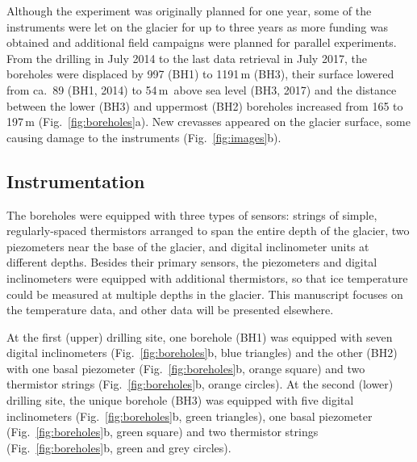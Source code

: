 \documentclass[utf8]{article}
\begin{document}
    Although the experiment was originally planned for one year, some of the
    instruments were let on the glacier for up to three years as more funding
    was obtained and additional field campaigns were planned for parallel
    experiments. From the drilling in July 2014 to the last data retrieval in
    July 2017, the boreholes were displaced by 997 (BH1) to 1191\,m (BH3),
    their surface lowered from ca.~89 (BH1, 2014) to 54\,m~above sea level
    (BH3, 2017) and
    the distance between the lower (BH3) and uppermost (BH2) boreholes
    increased from 165 to 197\,m (Fig.~\ref{fig:boreholes}a). New crevasses
    appeared on the glacier surface, some causing damage to the instruments
    (Fig.~\ref{fig:images}b).


\subsection{Instrumentation}

    The boreholes were equipped with three types of sensors: strings of simple,
    regularly-spaced thermistors arranged to span the entire depth of the
    glacier, two piezometers near the base of the glacier, and digital
    inclinometer units at different depths. Besides their primary sensors, the
    piezometers and digital inclinometers were equipped with additional
    thermistors, so that ice temperature could be measured at multiple depths
    in the glacier. This manuscript focuses on the temperature data, and other
    data will be presented elsewhere.

    At the first (upper) drilling site, one borehole (BH1) was equipped with
    seven digital inclinometers (Fig.~\ref{fig:boreholes}b, blue triangles) and
    the other (BH2) with one basal piezometer (Fig.~\ref{fig:boreholes}b,
    orange square) and two thermistor strings (Fig.~\ref{fig:boreholes}b,
    orange circles). At the second (lower) drilling site, the unique
    borehole (BH3) was equipped with five digital inclinometers
    (Fig.~\ref{fig:boreholes}b, green triangles), one basal piezometer
    (Fig.~\ref{fig:boreholes}b, green square) and two thermistor strings
    (Fig.~\ref{fig:boreholes}b, green and grey circles).
\end{document}
